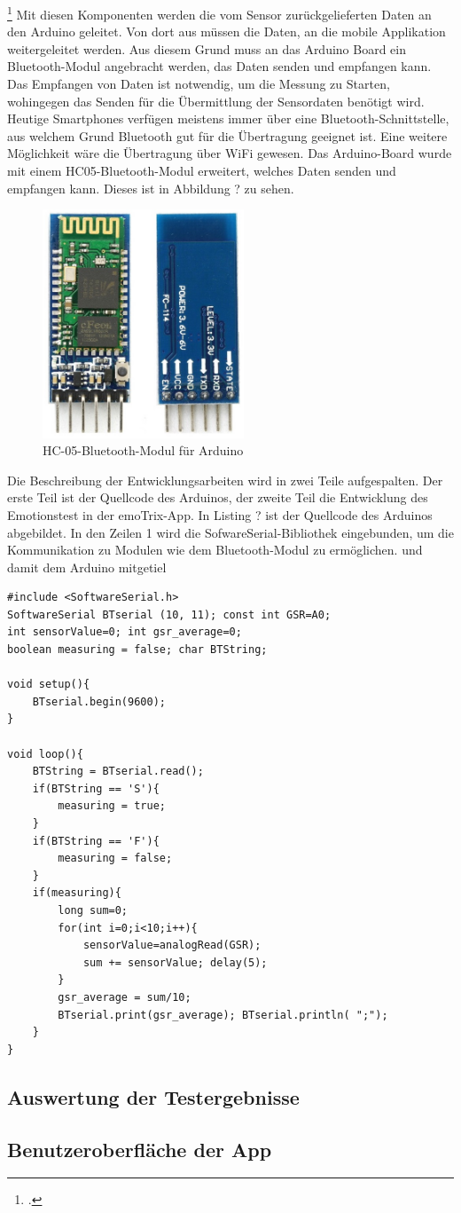 \footcitetext[Bilder von:][]{Sou18, Rei18}
\newline 
Mit diesen Komponenten werden die vom Sensor zurückgelieferten Daten an den Arduino geleitet. Von dort aus müssen die Daten, an die mobile Applikation weitergeleitet werden. Aus diesem Grund muss an das Arduino Board ein Bluetooth-Modul angebracht werden, das Daten senden und empfangen kann. Das Empfangen von Daten ist notwendig, um die Messung zu Starten, wohingegen das Senden für die Übermittlung der Sensordaten benötigt wird. Heutige Smartphones verfügen meistens immer über eine Bluetooth-Schnittstelle, aus welchem Grund Bluetooth gut für die Übertragung geeignet ist. Eine weitere Möglichkeit wäre die Übertragung über WiFi gewesen. Das Arduino-Board wurde mit einem HC05-Bluetooth-Modul erweitert, welches Daten senden und empfangen kann. Dieses ist in Abbildung ? zu sehen.
\begin{figure}[h]
	\centering
	\includegraphics[width=6cm]{Bilder/hc05.jpg}
	\caption[HC-05-Bluetooth-Modul für Arduino]{HC-05-Bluetooth-Modul für Arduino\footnotemark}
\end{figure}%
\newline
Die Beschreibung der Entwicklungsarbeiten wird in zwei Teile aufgespalten. Der erste Teil ist der Quellcode des Arduinos, der zweite Teil die Entwicklung des Emotionstest in der emoTrix-App. \newline
In Listing ? ist der Quellcode des Arduinos abgebildet. In den Zeilen 1 wird die SofwareSerial-Bibliothek eingebunden, um die Kommunikation zu Modulen wie dem Bluetooth-Modul zu ermöglichen. und damit dem Arduino mitgetiel\newpage
\begin{lstlisting}[caption={Quellcode des Arduinos},style=Arduino]
#include <SoftwareSerial.h>
SoftwareSerial BTserial (10, 11); const int GSR=A0;
int sensorValue=0; int gsr_average=0;
boolean measuring = false; char BTString;

void setup(){
	BTserial.begin(9600);
}

void loop(){
	BTString = BTserial.read();
	if(BTString == 'S'){
		measuring = true;
	}
	if(BTString == 'F'){
		measuring = false;
	}
	if(measuring){
		long sum=0;
		for(int i=0;i<10;i++){ 
			sensorValue=analogRead(GSR);
			sum += sensorValue; delay(5);
		}
		gsr_average = sum/10;
		BTserial.print(gsr_average); BTserial.println( ";");
	}
}
\end{lstlisting}
\subsection{Auswertung der Testergebnisse}
\subsection{Benutzeroberfläche der App}
